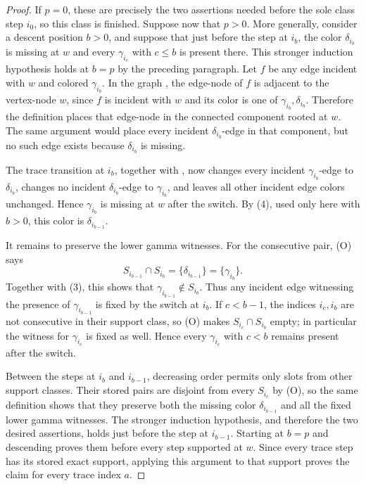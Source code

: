 \begin{proof}
If \(p=0\), these are precisely the two assertions needed before the sole
class step \(i_0\), so this class is finished.  Suppose now that \(p>0\).
More generally, consider a descent position \(b>0\), and suppose that just
before the step at \(i_b\), the color \(\delta_{i_b}\) is missing at \(w\)
and every \(\gamma_{i_c}\) with \(c\le b\) is present there.  This stronger
induction hypothesis holds at \(b=p\) by the preceding paragraph.  Let
\(f\) be any edge incident with \(w\) and colored \(\gamma_{i_b}\).  In the graph
, the edge-node of \(f\) is adjacent to the
vertex-node \(w\), since \(f\) is incident with \(w\) and its color is one
of \(\gamma_{i_b},\delta_{i_b}\).  Therefore the definition
 places that edge-node in the connected component
rooted at \(w\).  The same argument would place every incident
\(\delta_{i_b}\)-edge in that component, but no such edge exists because
\(\delta_{i_b}\) is missing.

The trace transition at \(i_b\), together with
, now changes every incident
\(\gamma_{i_b}\)-edge to \(\delta_{i_b}\), changes no incident
\(\delta_{i_b}\)-edge to \(\gamma_{i_b}\), and leaves all other incident
edge colors unchanged.  Hence \(\gamma_{i_b}\) is missing at \(w\) after
the switch.  By (4), used only here with \(b>0\), this color is
\(\delta_{i_{b-1}}\).

It remains to preserve the lower gamma witnesses.  For the consecutive pair,
(O) says
\[
 S_{i_{b-1}}\cap S_{i_b}
   =\{\delta_{i_{b-1}}\}=\{\gamma_{i_b}\}.
\]
Together with (3), this shows that
\(\gamma_{i_{b-1}}\notin S_{i_b}\).  Thus any incident edge witnessing the
presence of \(\gamma_{i_{b-1}}\) is fixed by the switch at \(i_b\).  If
\(c<b-1\), the indices \(i_c,i_b\) are not consecutive in their support
class, so (O) makes \(S_{i_c}\cap S_{i_b}\) empty; in particular the witness
for \(\gamma_{i_c}\) is fixed as well.  Hence every
\(\gamma_{i_c}\) with \(c<b\) remains present after the switch.

Between the steps at \(i_b\) and \(i_{b-1}\), decreasing order permits only
slots from other support classes.  Their stored pairs are disjoint from
every \(S_{i_c}\) by (O), so the same
 definition shows that they preserve both
the missing color \(\delta_{i_{b-1}}\) and all the fixed lower gamma
witnesses.  The stronger induction hypothesis, and therefore the two desired
assertions, holds just before the step at \(i_{b-1}\).  Starting at \(b=p\)
and descending proves them before every step supported at \(w\).  Since every
trace step has its stored exact support, applying this argument to that
support proves the claim for every trace index \(a\).
\end{proof}
